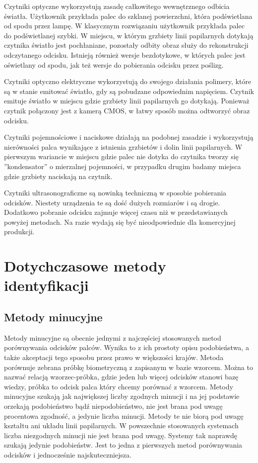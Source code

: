 Czytniki optyczne wykorzystują zasadę całkowitego wewnętrznego odbicia światła. Użytkownik przykłada palec do szklanej powierzchni, która podświetlana od spodu przez lampę. W klasycznym rozwiązaniu użytkownik przykłada palec do podświetlanej szybki. W miejscu, w którym grzbiety linii papilarnych dotykają czytnika światło jest pochłaniane, pozostały odbity obraz służy do rekonstrukcji odczytanego odcisku. Istnieją również wersje bezdotykowe, w których palec jest oświetlany od spodu, jak też wersje do pobierania odcisku przez poślizg.

Czytniki optyczno elektryczne wykorzystują do swojego działania polimery, które są w stanie emitować światło, gdy są pobudzane odpowiednim napięciem. Czytnik emituje światło w miejscu gdzie grzbiety linii papilarnych go dotykają. Ponieważ czytnik połączony jest z kamerą CMOS, w łatwy sposób można odtworzyć obraz odcisku.

Czytniki pojemnościowe i naciskowe działają na podobnej zasadzie i wykorzystują nierówności palca wynikające z istnienia grzbietów i dolin linii papilarnych. W pierwszym wariancie w miejscu gdzie palec nie dotyka do czytnika tworzy się ''kondensator'' o mierzalnej pojemności, w przypadku drugim badamy miejsca gdzie grzbiety naciskają na czytnik.

Czytniki ultrasonograficzne są nowinką techniczną w sposobie pobierania odcisków. Niestety urządzenia te są dość dużych rozmiarów i są drogie. Dodatkowo pobranie odcisku zajmuje więcej czasu niż w przedstawianych powyżej metodach. Na razie wydają się być nieodpowiednie dla komercyjnej produkcji.

\section[Dotychczasowe metody identyfikacji][Dotychczasowe metody identyfikacji]{Dotychczasowe metody identyfikacji}

\subsection[Metody minucyjne][Metody minucyjne]{Metody minucyjne}

Metody minucyjne są obecnie jednymi z najczęściej stosowanych metod porównywania odcisków palców. Wynika to z ich prostoty opisu podobieństwa, a także akceptacji tego sposobu przez prawo w większości krajów. Metoda porównuje zebrana próbkę biometryczną z zapisanym w bazie wzorcem. Można to nazwać relacją wzorzec-próbka, gdzie jeden lub więcej odcisków stanowi bazę wiedzy, próbka to odcisk palca który chcemy porównać z wzorcem. Metody minucyjne szukają jak największej liczby zgodnych minucji i na jej podstawie orzekają podobieństwo bądź niepodobieństwo, nie jest brana pod uwagę procentowa zgodność, a jedynie liczba minucji. Metody te nie biorą pod uwagę kształtu ani układu linii papilarnych. W powszechnie stosowanych systemach liczba niezgodnych minucji nie jest brana pod uwagę. Systemy tak naprawdę szukają jedynie podobieństw. Jest to jedna z pierwszych metod porównywania odcisków i jednocześnie najskuteczniejsza. 

